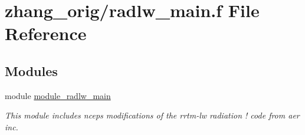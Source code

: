 \hypertarget{zhang__orig_2radlw__main_8f}{}\section{zhang\+\_\+orig/radlw\+\_\+main.f File Reference}
\label{zhang__orig_2radlw__main_8f}
\subsection*{Modules}
\begin{DoxyCompactItemize}
\item 
module \hyperlink{namespacemodule__radlw__main}{module\+\_\+radlw\+\_\+main}
\begin{DoxyCompactList}\small\item\em This module includes ncep\textquotesingle{}s modifications of the rrtm-\/lw radiation ! code from aer inc. \end{DoxyCompactList}\end{DoxyCompactItemize}
